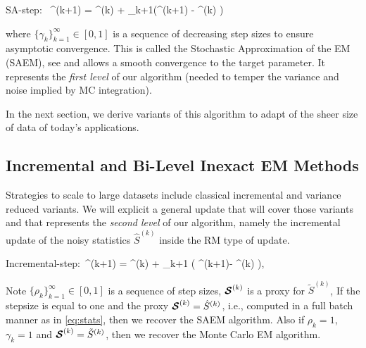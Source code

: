 \documentclass[11pt]{article}
\theoremstyle{t}
\begin{document}
\beq\label{eq:rmstep}
\textsf{SA-step}:~ \hat{\bss}^{(k+1)} =  \hat{\bss}^{(k)}  + \gamma_{k+1}(^{(k+1)} - \hat{\bss}^{(k)} )
\eeq

where $\{ \gamma_{k} \}_{k=1}^\infty \in [0,1]$ is a sequence of decreasing step sizes to ensure asymptotic convergence.
This is called the Stochastic Approximation of the EM (SAEM), see \citep{delyon1999} and allows a smooth convergence to the target parameter.
It represents the \textit{first level} of our algorithm (needed to temper the variance and noise implied by MC integration).

In the next section, we derive variants of this algorithm to adapt of the sheer size of data of today's applications.

\subsection{Incremental and Bi-Level Inexact EM Methods} \label{sec:sEM}
Strategies to scale to large datasets include classical incremental and variance reduced variants.
We will explicit a general update that will cover those variants and that represents the \textit{second level} of our algorithm, namely the incremental update of the noisy statistics $\hat{S}^{(k)}$ inside the RM type of update.

\beq \label{eq:sestep}
\textsf{Incremental-step}:~^{(k+1)} = ^{(k)} + \rho_{k+1} \big( \StocEstep^{(k+1)}- ^{(k)}  \big),
\eeq

Note $\{ \rho_{k} \}_{k=1}^\infty \in [0,1]$ is a sequence of step sizes, $\StocEstep^{(k)}$ is a proxy for $\tilde{S}^{(k)}$,
If the stepsize is equal to one and the proxy $\StocEstep^{(k)} = \hat{S}^{(k)}$, i.e., computed in a full batch manner as in \eqref{eq:stats}, then we recover the SAEM algorithm.
Also if $\rho_{k}=1$, $\gamma_{k}=1$ and $\StocEstep^{(k)} = \tilde{S}^{(k)}$, then we recover the Monte Carlo EM algorithm.
\end{document}
